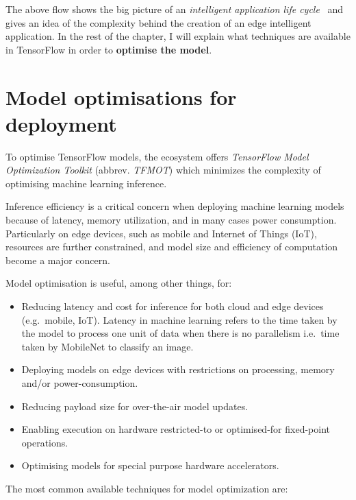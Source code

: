 The above flow shows the big picture of an \textit{intelligent application life
cycle}~\cite{tflite:intro} and gives an idea of the complexity behind the
creation of an edge intelligent application.
In the rest of the chapter, I will explain what techniques are available in
TensorFlow in order to \textbf{optimise the model}.

\section{Model optimisations for deployment}\label{sec:MO}

To optimise TensorFlow models, the ecosystem offers \textit{TensorFlow Model
Optimization Toolkit} (abbrev. \textit{TFMOT}) which minimizes the complexity
of optimising machine learning inference.

Inference efficiency is a critical concern when deploying machine learning
models because of latency, memory utilization, and in many cases power
consumption. Particularly on edge devices, such as mobile and Internet of
Things (IoT), resources are further constrained, and model size and efficiency
of computation become a major concern.

Model optimisation is useful, among other things, for:

\begin{itemize}
    \item Reducing latency and cost for inference for both cloud and edge
        devices (e.g.\ mobile, IoT).
        Latency in machine learning refers to the time taken by the model to
        process one unit of data when there is no parallelism i.e.\ time taken
        by MobileNet to classify an image.
    \item Deploying models on edge devices with restrictions on processing,
        memory and/or power-consumption.
    \item Reducing payload size for over-the-air model updates.
    \item Enabling execution on hardware restricted-to or optimised-for
        fixed-point operations.
    \item Optimising models for special purpose hardware accelerators.
\end{itemize}

The most common available techniques for model optimization are:

